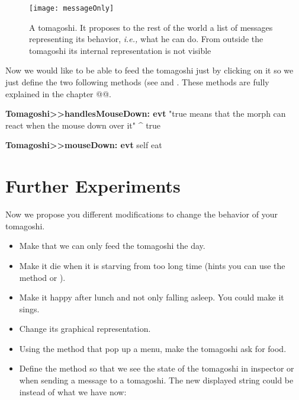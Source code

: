 \begin{figure}
\begin{center}
\texttt{[image: messageOnly]}
\caption{A tomagoshi. It proposes to the rest of the world a list of messages representing its 
behavior, \textit{i.e.,} what he can do. From outside the tomagoshi its internal representation is not visible\label{fig:messageOnly}}
\end{center}
\end{figure}


Now we would like to be able to feed the tomagoshi just by clicking on it so we just define the two following methods (see  and . These methods are fully explained in the chapter @@. 

\begin{method}\label{mth:tomahandlesMouseDown}
\textbf{Tomagoshi>>handlesMouseDown: evt}
   "true means that the morph can react when the mouse down over it"
   ^ true
\end{method}

\begin{method}\label{mth:tomamouseDown}
\textbf{Tomagoshi>>mouseDown: evt}
    self eat
\end{method}


\section{Further Experiments}
Now we propose you different modifications to change the behavior of your tomagoshi. 

\begin{itemize}
\item Make that we can only feed the tomagoshi the day. 
\item Make it die when it is starving from too long time (hints you can use the method 
 or ).
\item Make it happy after lunch and not only falling asleep. You could make it sings.
\item Change its graphical representation.  
\item Using the method  that pop up a menu, make
 the tomagoshi ask for food. 
\item Define the method  so that we see the state of the
 tomagoshi in inspector or when sending a  message to a tomagoshi. The
 new displayed string could be  instead of
 what we have now:  
\end{itemize}

